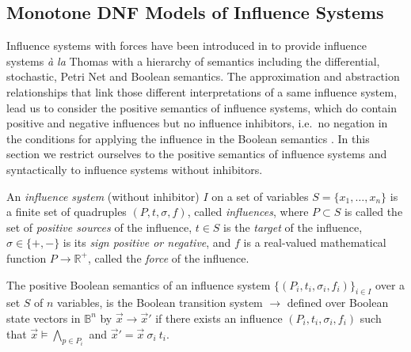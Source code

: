 \documentclass{llncs}
\newcommand{\lra}{\longrightarrow}
\begin{document}
\subsection{Monotone DNF Models of Influence Systems}

Influence systems with forces have been introduced in \cite{FMRS16cmsb} 
to provide influence systems \emph{\`a la} Thomas with a hierarchy of semantics
including the differential, stochastic, Petri Net and Boolean semantics.
The approximation and abstraction relationships that link those different interpretations of a same influence system,
lead us to consider the positive semantics of influence systems,
which do contain positive and negative influences but no influence inhibitors, i.e.~no negation in the conditions
for applying the influence in the Boolean semantics \cite{FMRS16cmsb}.
In this section we restrict ourselves to the positive semantics of influence systems
and syntactically to influence systems without inhibitors.

\begin{definition}

   An \emph{influence system} (without inhibitor) $I$ on a set of variables $S=\{x_1,\dots,x_n\}$ is a
   finite set of quadruples $(P, t, \sigma, f)$, called \emph{influences}, where
   $P\subset S$ is called the set of \emph{positive sources} of the influence,
$t\in S$ is the \emph{target} of the influence,
   $\sigma\in\{+,-\}$ is its \emph{sign positive or negative}, and $f$ is a
   real-valued mathematical function $P\to\mathbb{R^+}$, called the
   \emph{force} of the influence.

\end{definition}

\begin{definition}
The positive Boolean semantics of an influence system $\{(P_i, t_i, \sigma_i, f_i)\}_{i\in I}$
over a set $S$ of $n$ variables,
is the Boolean transition system $\lra$ defined over Boolean state vectors in $\mathbb{B}^n$
by
${\vec x}\lra{\vec x'}$ if there exists an influence $(P_i, t_i, \sigma_i, f_i)$
such that ${\vec x}\models \bigwedge_{p\in P_i}$
and ${\vec x'} = {\vec x}\ \sigma_i\ t_i$.
\end{definition}


\end{document}

